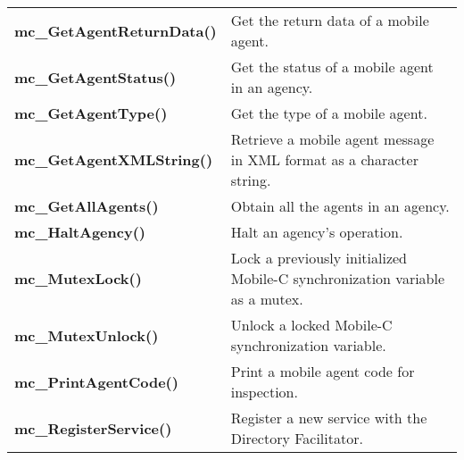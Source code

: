 \begin{table}[!h]
\begin{center}
\begin{tabular}{p{63 mm}p{97 mm}}
{\bf mc\_GetAgentReturnData()} \dotfill  &  Get the return data of a mobile agent. \\
{\bf mc\_GetAgentStatus()} \dotfill  &  Get the status of a mobile agent in an agency. \\
{\bf mc\_GetAgentType()} \dotfill  &  Get the type of a mobile agent. \\
{\bf mc\_GetAgentXMLString()} \dotfill  &  Retrieve a mobile agent message in XML format as a character string. \\
{\bf mc\_GetAllAgents()} \dotfill  &  Obtain all the agents in an agency. \\
{\bf mc\_HaltAgency()} \dotfill  &  Halt an agency's operation. \\
{\bf mc\_MutexLock()} \dotfill  &  Lock a previously initialized Mobile-C synchronization variable as a mutex. \\
{\bf mc\_MutexUnlock()} \dotfill  &  Unlock a locked Mobile-C synchronization variable. \\
{\bf mc\_PrintAgentCode()} \dotfill  &  Print a mobile agent code for inspection. \\
{\bf mc\_RegisterService()} \dotfill  &   Register a new service with the Directory Facilitator. \\
\hline
\end{tabular}
\end{center}
\label{chmobilec_api_cscript}
\end{table}
\pagebreak

